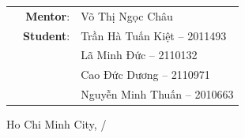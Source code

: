 \documentclass[12pt, a4paper]{article}
\begin{document}
\begin{titlepage}
    \vspace{1cm}
    \begin{table}[H]
        \begin{tabular}{rrl}
        \hspace{5 cm} & \textbf{Mentor}: & Võ Thị Ngọc Châu\\
        
        & \textbf{Student}: & Trần Hà Tuấn Kiệt -- 2011493 \\
        & & Lã Minh Đức -- 2110132 \\
        & & Cao Đức Dương -- 2110971 \\
        & & Nguyễn Minh Thuấn -- 2010663 \\
        
        \end{tabular}
        \end{table}
    \vspace{1cm}

    \begin{center}
        {\large Ho Chi Minh City, \the\month/\the\year}
    \end{center}
\end{titlepage}


\newpage
\end{document}
